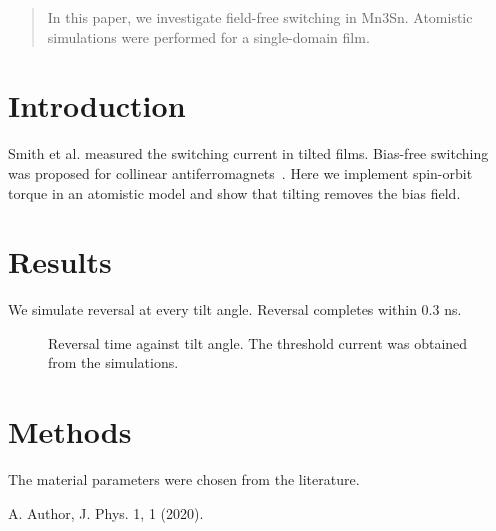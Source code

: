 \documentclass{article}
\begin{document}
\begin{abstract}
In this paper, we investigate field-free switching in Mn3Sn.
Atomistic simulations were performed for a single-domain film.
\end{abstract}

\section{Introduction}
Smith et al. measured the switching current in tilted films.
Bias-free switching was proposed for collinear antiferromagnets~\cite{a}.
Here we implement spin-orbit torque in an atomistic model and show that tilting removes the bias field.

\section{Results}
We simulate reversal at every tilt angle. Reversal completes within 0.3 ns.

\begin{figure}
\caption{Reversal time against tilt angle. The threshold current was obtained from the simulations.}
\end{figure}

\section*{Methods}
The material parameters were chosen from the literature.

\begin{thebibliography}{1}
 A. Author, J. Phys. 1, 1 (2020).
\end{thebibliography}
\end{document}
